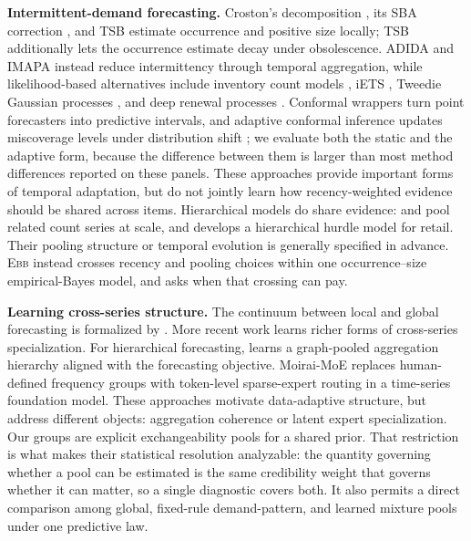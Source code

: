 \documentclass[twoside]{article}
\theoremstyle{definition}
\newcommand{\EBB}{\textsc{Ebb}}
\begin{document}
\textbf{Intermittent-demand forecasting.} Croston's decomposition
\citep{croston1972}, its SBA correction \citep{syntetos2005accuracy}, and
TSB \citep{teunter2011} estimate occurrence and positive size locally;
TSB additionally lets the occurrence estimate decay under obsolescence.
ADIDA \citep{nikolopoulos2011} and IMAPA \citep{kourentzes2016} instead
reduce intermittency through temporal aggregation, while likelihood-based
alternatives include inventory count models \citep{snyder2012}, iETS
\citep{svetunkov2023iets}, Tweedie Gaussian processes \citep{damato2025},
and deep renewal processes \citep{turkmen2019}. Conformal wrappers turn
point forecasters into predictive intervals, and adaptive conformal
inference updates miscoverage levels under distribution shift
\citep{gibbs2021}; we evaluate both the static and the adaptive form,
because the difference between them is larger than most method
differences reported on these panels. These approaches provide important
forms of temporal adaptation, but do not jointly learn how
recency-weighted evidence should be shared across items. Hierarchical
models do share evidence: \citet{chapados2014} and \citet{seeger2016}
pool related count series at scale, and \citet{pitkin2024} develops a
hierarchical hurdle model for retail. Their pooling structure or temporal
evolution is generally specified in advance. \EBB{} instead crosses
recency and pooling choices within one occurrence--size empirical-Bayes
model, and asks when that crossing can pay.

\textbf{Learning cross-series structure.} The continuum between local and
global forecasting is formalized by \citet{monteromanso2021}. More recent
work learns richer forms of cross-series specialization. For hierarchical
forecasting, \citet{cini2024} learns a graph-pooled aggregation hierarchy
aligned with the forecasting objective. Moirai-MoE \citep{liu2025moirai}
replaces human-defined frequency groups with token-level sparse-expert
routing in a time-series foundation model. These approaches motivate
data-adaptive structure, but address different objects: aggregation
coherence or latent expert specialization. Our groups are explicit
exchangeability pools for a shared prior. That restriction is what makes
their statistical resolution analyzable: the quantity governing whether a
pool can be estimated is the same credibility weight that governs whether
it can matter, so a single diagnostic covers both. It also permits a
direct comparison among global, fixed-rule demand-pattern, and learned
mixture pools under one predictive law.
\end{document}
